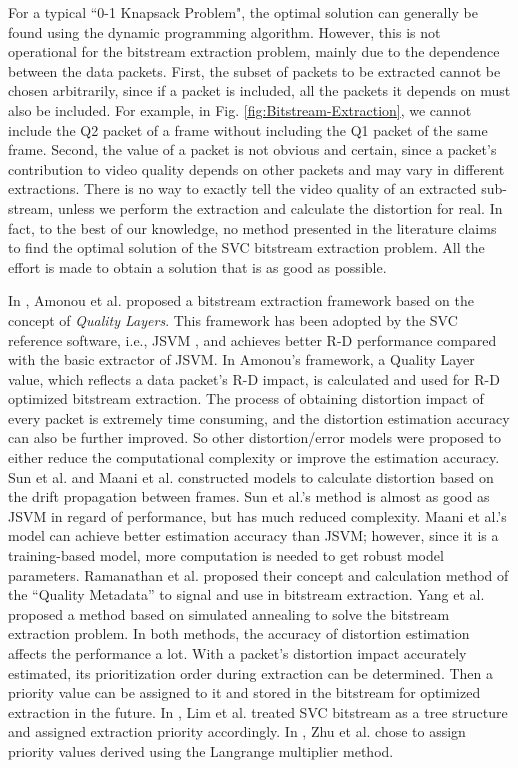 \documentclass[journal]{IEEEtran}
\begin{document}
For a typical ``0-1 Knapsack Problem", the optimal solution can generally be found using the dynamic programming algorithm. However, this is not operational for the bitstream extraction problem, mainly due to the dependence between the data packets. First, the subset of packets to be extracted cannot be chosen arbitrarily, since if a packet is included, all the packets it depends on must also be included. For example, in Fig. \ref{fig:Bitstream-Extraction}, we cannot include the Q2 packet of a frame without including the Q1 packet of the same frame. Second, the value of a packet is not obvious and certain, since a packet's contribution to video quality depends on other packets and may vary in different extractions. There is no way to exactly tell the video quality of an extracted sub-stream, unless we perform the extraction and calculate the distortion for real. In fact, to the best of our knowledge, no method presented in the literature claims to find the optimal solution of the SVC bitstream extraction problem. All the effort is made to obtain a solution that is as good as possible.

In \cite{Amonou07}, Amonou et al. proposed a bitstream extraction framework based on the concept of \textit{Quality Layers}. This framework has been adopted by the SVC reference software, i.e., JSVM \cite{JSVM}, and achieves better R-D performance compared with the basic extractor of JSVM. In Amonou's framework, a Quality Layer value, which reflects a data packet's R-D impact, is calculated and used for R-D optimized bitstream extraction. The process of obtaining distortion impact of every packet is extremely time consuming, and the distortion estimation accuracy can also be further improved. So other distortion/error models were proposed to either reduce the computational complexity or improve the estimation accuracy. Sun et al. \cite{Sun09} and Maani et al. \cite{Maani09} constructed models to calculate distortion based on the drift propagation between frames. Sun et al.'s method is almost as good as JSVM in regard of performance, but has much reduced complexity. Maani et al.'s model can achieve better estimation accuracy than JSVM; however, since it is a training-based model, more computation is needed to get robust model parameters. Ramanathan et al. \cite{Ramanathan12} proposed their concept and calculation method of the ``Quality Metadata'' to signal and use in bitstream extraction. Yang et al. \cite{Yang13} proposed a method based on simulated annealing to solve the bitstream extraction problem. In both methods, the accuracy of distortion estimation affects the performance a lot. With a packet's distortion impact accurately estimated, its prioritization order during extraction can be determined. Then a priority value can be assigned to it and stored in the bitstream for optimized extraction in the future. In \cite{Lim06}, Lim et al. treated SVC bitstream as a tree structure and assigned extraction priority accordingly. In \cite{Zhu11}, Zhu et al. chose to assign priority values derived using the Langrange multiplier method.
\end{document}
